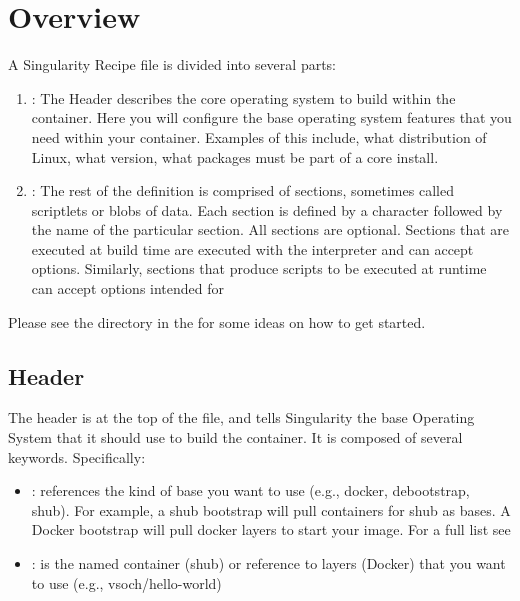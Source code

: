 \documentclass[letterpaper,10pt,english]{sphinxmanual}
\begin{document}
\section{Overview}
\label{\detokenize{container_recipes:overview}}
A Singularity Recipe file is divided into several parts:
\begin{enumerate}
\item {} 
: The Header describes the core operating system to build
within the container. Here you will configure the base operating
system features that you need within your container. Examples of this
include, what distribution of Linux, what version, what packages must
be part of a core install.

\item {} 
: The rest of the definition is comprised of sections,
sometimes called scriptlets or blobs of data. Each section is defined
by a \sphinxcode{\sphinxupquote{\%}} character followed by the name of the particular section. All
sections are optional. Sections that are executed at build time are
executed with the  interpreter and can accept  options. Similarly,
sections that produce scripts to be executed at runtime can accept
options intended for 

\end{enumerate}

\begin{DUlineblock}{0em}
\item[] Please see the {\hyperref[\detokenize{container_recipes:examples}]{}} directory in the 
for some ideas on how to get started.
\end{DUlineblock}


\subsection{Header}
\label{\detokenize{container_recipes:header}}
The header is at the top of the file, and tells Singularity the base
Operating System that it should use to build the container. It is
composed of several keywords. Specifically:
\begin{itemize}
\item {} 
: references the kind of base you want to use (e.g., docker,
debootstrap, shub). For example, a shub bootstrap will pull
containers for shub as bases. A Docker bootstrap will pull docker
layers to start your image. For a full list see 

\item {} 
: is the named container (shub) or reference to layers (Docker) that
you want to use (e.g., vsoch/hello-world)

\end{itemize}
\end{document}
